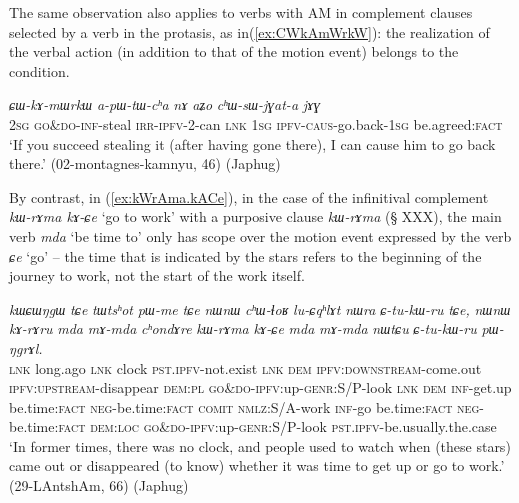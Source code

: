 \documentclass[oneside,a4paper,11pt]{article}
\newcommand{\ipa}[1]{{\phon\textit{#1}}}
\newcommand{\forme}[1]{\textit{\phon#1}}
\newcommand{\japhug}[2]{\textit{\phon#1} `#2'}
\newcommand{\rouge}[1]{{\color{red}#1}}
\begin{document}
The same observation also applies to  verbs with AM in complement clauses selected by a verb in the protasis, as in(\ref{ex:CWkAmWrkW}): the realization of the verbal action (in addition to that of the motion event) belongs to the condition.

\begin{exe}
\ex \label{ex:CWkAmWrkW}
\gll \ipa{nɤʑo}	\ipa{\rouge{ɕɯ}-kɤ-mɯrkɯ}	\ipa{a-pɯ-tɯ-cʰa}	\ipa{nɤ}	\ipa{aʑo}	\ipa{cʰɯ-sɯ-jɣat-a}	\ipa{jɤɣ} \\
\textsc{2sg} \rouge{\textsc{go\&do}}-\textsc{inf}-steal \textsc{irr}-\textsc{ipfv}-2-can \textsc{lnk} \textsc{1sg} \textsc{ipfv}-\textsc{caus}-go.back-\textsc{1sg} be.agreed:\textsc{fact} \\
\glt `If you succeed stealing it (after having gone there), I can cause him to go back there.' (02-montagnes-kamnyu, 46) (Japhug)
\end{exe}

By contrast, in  (\ref{ex:kWrAma.kACe}), in the case of the infinitival complement \forme{kɯ-rɤma kɤ-ɕe} `go to work' with a purposive clause \forme{kɯ-rɤma} (§ XXX), the main verb \japhug{mda}{be time to} only has scope over the motion event expressed by the verb \japhug{ɕe}{go} -- the time that is indicated by the stars refers to the beginning of the journey to work, not the start of the work itself.
 
 \begin{exe}
\ex \label{ex:kWrAma.kACe}
\gll  \ipa{tɕe}	\ipa{kɯɕɯŋgɯ}	\ipa{tɕe}	\ipa{tɯtsʰot}	\ipa{pɯ-me}	\ipa{tɕe}	\ipa{nɯnɯ}	\ipa{cʰɯ-ɬoʁ}	\ipa{lu-ɕqʰlɤt}	\ipa{nɯra}	\ipa{ɕ-tu-kɯ-ru}	\ipa{tɕe,}	\ipa{nɯnɯ}	\ipa{kɤ-rɤru}	\ipa{mda}	\ipa{mɤ-mda}	\ipa{cʰondɤre}	\ipa{kɯ-rɤma}	\ipa{kɤ-ɕe}	\ipa{mda}	\ipa{mɤ-mda}	\ipa{nɯtɕu}	\ipa{ɕ-tu-kɯ-ru}	\ipa{pɯ-ŋgrɤl.} \\
 \textsc{lnk} long.ago \textsc{lnk} clock \textsc{pst}.\textsc{ipfv}-not.exist \textsc{lnk} \textsc{dem} \textsc{ipfv}:\textsc{downstream}-come.out \textsc{ipfv}:\textsc{upstream}-disappear \textsc{dem}:\textsc{pl} \textsc{go\&do}-\textsc{ipfv}:up-\textsc{genr}:S/P-look \textsc{lnk} \textsc{dem} \textsc{inf}-get.up be.time:\textsc{fact} \textsc{neg}-be.time:\textsc{fact} \textsc{comit} \textsc{nmlz}:S/A-work \textsc{inf}-go be.time:\textsc{fact} \textsc{neg}-be.time:\textsc{fact} \textsc{dem}:\textsc{loc} \textsc{go\&do}-\textsc{ipfv}:up-\textsc{genr}:S/P-look \textsc{pst}.\textsc{ipfv}-be.usually.the.case  \\
 \glt  `In former times, there was no clock, and people used to watch when (these stars) came out or disappeared (to know) whether it was time to get up or go to work.' (29-LAntshAm, 66) (Japhug)
  \end{exe}
  
\end{document}
